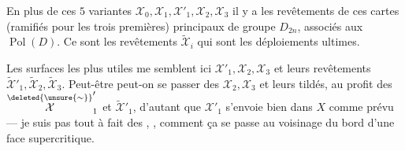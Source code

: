 
En plus de ces $5$ variantes $\mathcal X_0,\mathcal X_1,\mathcal X'_1,\mathcal X_2,\mathcal X_3$ il y a  les revêtements de ces cartes (ramifiés pour les trois premières) principaux de groupe $D_{2n}$, associés aux $\operatorname{Pol}(D)$. Ce sont les revêtements $\widetilde{\mathcal X}_i$ qui sont les déploiements ultimes.

Les surfaces les plus utiles me semblent ici $\mathcal X'_1,\mathcal X_2,\mathcal X_3$ et leurs revêtements $\widetilde{\mathcal X}'_1,\widetilde{\mathcal X}_2,\widetilde{\mathcal X}_3$. Peut-être peut-on se passer des $\mathcal X_2,\mathcal X_3$ et leurs tildés, au profit des $\overset{\deleted{\unsure{\sim}}}{\mathcal X}'_1$ et $\widetilde{\mathcal X}'_1$, d'autant que $\mathcal X'_1$ s'envoie bien dans $X$ comme prévu --- je  suis pas tout à fait  des ,  , comment ça se passe au voisinage du bord d'une face supercritique.


